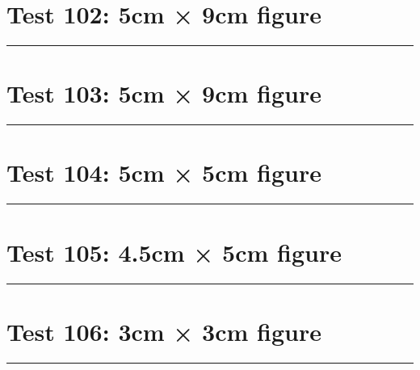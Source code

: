 \documentclass[a4paper,11pt]{article}
\begin{document}
\section*{Test 102: 5cm × 9cm figure}
\begin{swarmwrap}%
  \begin{minipage}[t]{5cm}
    \centering
    \rule{\linewidth}{9cm}
  \end{minipage}%
\end{swarmwrap}%
\swarmwrapnext
\lipsum[53]
\lipsum[54]
\lipsum[55]
\lipsum[56]
\section*{Test 103: 5cm × 9cm figure}
\begin{swarmwrap}%
  \begin{minipage}[t]{5cm}
    \centering
    \rule{\linewidth}{9cm}
  \end{minipage}%
\end{swarmwrap}%
\swarmwrapnext
\lipsum[80]
\lipsum[81]
\lipsum[82]
\lipsum[83]
\lipsum[84]
\section*{Test 104: 5cm × 5cm figure}
\begin{swarmwrap}%
  \begin{minipage}[t]{5cm}
    \centering
    \rule{\linewidth}{5cm}
  \end{minipage}%
\end{swarmwrap}%
\swarmwrapnext
\lipsum[8]
\lipsum[9]
\lipsum[10]
\lipsum[11]
\section*{Test 105: 4.5cm × 5cm figure}
\begin{swarmwrap}%
  \begin{minipage}[t]{4cm}
    \centering
    \rule{\linewidth}{5cm}
  \end{minipage}%
\end{swarmwrap}%
\swarmwrapnext
\lipsum[86]
\lipsum[87]
\lipsum[88]
\lipsum[89]
\lipsum[90]
\lipsum[91]
\section*{Test 106: 3cm × 3cm figure}
\begin{swarmwrap}%
  \begin{minipage}[t]{3cm}
    \centering
    \rule{\linewidth}{3cm}
  \end{minipage}%
\end{swarmwrap}%
\swarmwrapnext
\lipsum[91]
\lipsum[92]
\lipsum[93]
\lipsum[94]
\lipsum[95]
\end{document}
